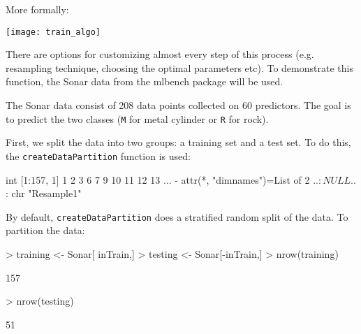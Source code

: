 \documentclass[12pt]{article}
\newcommand{\code}[1]{\mbox{\footnotesize\color{darkblue}\texttt{#1}}}
\newcommand{\pkg}[1]{{\fontseries{b}\selectfont #1}}
\renewcommand{\pkg}[1]{{\textsf{#1}}}
\renewenvironment{Schunk}{\vspace{\topsep}}{\vspace{\topsep}}
\begin{document}
More formally:

  \begin{center}  
    \texttt{[image: train\_algo]}
  \end{center}

There are options for customizing almost every step of this process (e.g. resampling technique, choosing the optimal parameters etc). To demonstrate this function, the Sonar data from the \pkg{mlbench} package will be used.

The Sonar data consist of 208 data points collected on 60 predictors. The goal is to predict the two classes (\texttt{M} for metal cylinder or \texttt{R} for rock).

First, we split the data into two groups: a training set and a test set. To do this, the \code{createDataPartition} function is used:
\begin{Schunk}
\begin{Soutput}
 int [1:157, 1] 1 2 3 6 7 9 10 11 12 13 ...
 - attr(*, "dimnames")=List of 2
  ..$ : NULL
  ..$ : chr "Resample1"
\end{Soutput}
\end{Schunk}
By default, \code{createDataPartition} does a stratified random split of the data. To partition the data:

\begin{Schunk}
\begin{Sinput}
> training <- Sonar[ inTrain,]
> testing  <- Sonar[-inTrain,]
> nrow(training)
\end{Sinput}
\begin{Soutput}
[1] 157
\end{Soutput}
\begin{Sinput}
> nrow(testing)
\end{Sinput}
\begin{Soutput}
[1] 51
\end{Soutput}
\end{Schunk}
\end{document}
